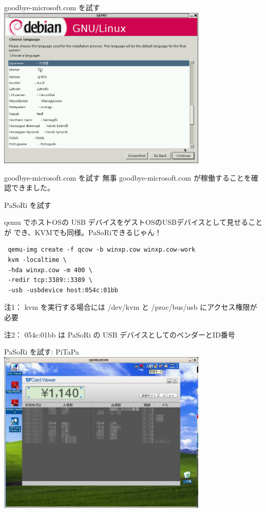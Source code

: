 \documentclass[cjk,dvipdfmx]{beamer}
\begin{document}
\begin{frame}[containsverbatim]{goodbye-microsoft.com を試す}
\includegraphics[width=10cm]{image200703/goodbyemicrosoftcom7.png}
\end{frame}
\begin{frame}[containsverbatim]{goodbye-microsoft.com を試す}
無事 goodbye-microsoft.com が稼働することを確認できました。
\end{frame}

\begin{frame}[containsverbatim]{PaSoRi を試す}

qemu でホストOSの USB デバイスをゲストOSのUSBデバイスとして見せることが
 でき、KVMでも同様。PaSoRiできるじゃん！

\begin{verbatim}
 qemu-img create -f qcow -b winxp.cow winxp.cow-work
 kvm -localtime \
 -hda winxp.cow -m 400 \
 -redir tcp:3389::3389 \
 -usb -usbdevice host:054c:01bb
\end{verbatim}

注1： kvm を実行する場合には /dev/kvm と /proc/bus/usb にアクセス権限が
 必要

注2： 054c:01bb は PaSoRi の USB デバイスとしてのベンダーとID番号
\end{frame}

\begin{frame}{PaSoRi を試す: PiTaPa}
\includegraphics[width=10cm]{image200703/edy1.jpg}
\end{frame}
\end{document}
